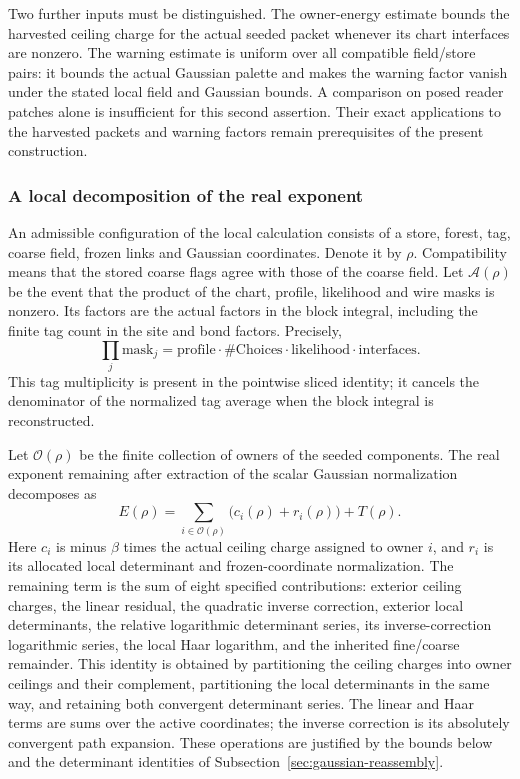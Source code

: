 Two further inputs must be distinguished. The owner-energy
estimate bounds the harvested ceiling charge for the actual seeded
packet whenever its chart interfaces are nonzero. The warning estimate
is uniform over all compatible field/store pairs: it bounds the
actual Gaussian palette and makes the warning factor vanish under
the stated local field and Gaussian bounds. A comparison on posed
reader patches alone is insufficient for this second assertion.
Their exact applications to the harvested packets and warning
factors remain prerequisites of the present construction.

\subsubsection{A local decomposition of the real exponent}

An admissible configuration of the local calculation consists of a
store, forest, tag, coarse field, frozen links and Gaussian
coordinates. Denote it by $\rho$. Compatibility means that the
stored coarse flags agree with those of the coarse field. Let
$\mathcal A(\rho)$ be the event that the product of the chart,
profile, likelihood and wire masks is nonzero. Its factors are
the actual factors in the block integral, including the finite tag
count in the site and bond factors. Precisely,
\[
 \prod_j\mathrm{mask}_j
 =\mathrm{profile}\cdot\#\mathrm{Choices}\cdot
      \mathrm{likelihood}\cdot\mathrm{interfaces}.
\]
This tag multiplicity is present in the pointwise sliced identity;
it cancels the denominator of the normalized tag average when the
block integral is reconstructed.

Let $\mathcal O(\rho)$ be the finite collection of owners of
the seeded components. The real exponent remaining after extraction
of the scalar Gaussian normalization decomposes as
\begin{equation}\label{eq:actual-body-exponent-split}
 E(\rho)=\sum_{i\in\mathcal O(\rho)}
                \bigl(c_i(\rho)+r_i(\rho)\bigr)
       +T(\rho).
\end{equation}
Here $c_i$ is minus $\beta$ times the actual ceiling charge
assigned to owner $i$, and $r_i$ is its allocated local
determinant and frozen-coordinate normalization. The remaining
term is the sum of eight specified contributions: exterior
ceiling charges, the linear residual, the quadratic inverse
correction, exterior local determinants, the relative logarithmic
determinant series, its inverse-correction logarithmic series,
the local Haar logarithm, and the inherited fine/coarse remainder.
This identity is obtained by partitioning the ceiling charges into
owner ceilings and their complement, partitioning the local
determinants in the same way, and retaining both convergent
determinant series. The linear and Haar terms are sums over the
active coordinates; the inverse correction is its absolutely
convergent path expansion. These operations are justified by the
bounds below and the determinant identities of
Subsection~\ref{sec:gaussian-reassembly}.

